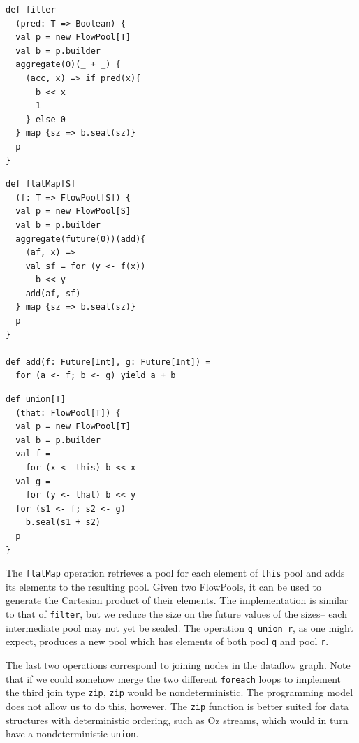 \noindent
\begin{minipage}[t]{5.2 cm}
\begin{verbatim}
def filter
  (pred: T => Boolean) {
  val p = new FlowPool[T]
  val b = p.builder
  aggregate(0)(_ + _) {
    (acc, x) => if pred(x){
      b << x
      1
    } else 0
  } map {sz => b.seal(sz)}
  p
}
\end{verbatim}
\end{minipage}\begin{minipage}[t]{5.3 cm}
\begin{verbatim}
def flatMap[S]
  (f: T => FlowPool[S]) {
  val p = new FlowPool[S]
  val b = p.builder
  aggregate(future(0))(add){
    (af, x) =>
    val sf = for (y <- f(x))
      b << y
    add(af, sf)
  } map {sz => b.seal(sz)}
  p
}

def add(f: Future[Int], g: Future[Int]) =
  for (a <- f; b <- g) yield a + b
\end{verbatim}
\end{minipage}
\begin{minipage}[t]{4 cm}
\begin{verbatim}
def union[T]
  (that: FlowPool[T]) {
  val p = new FlowPool[T]
  val b = p.builder
  val f =
    for (x <- this) b << x
  val g =
    for (y <- that) b << y
  for (s1 <- f; s2 <- g)
    b.seal(s1 + s2)
  p
}
\end{verbatim}
\end{minipage}

The \verb=flatMap= operation retrieves a pool for each element of
\verb=this= pool and adds its elements to the resulting pool.
Given two FlowPools, it can be used to generate the Cartesian product
of their elements.
The implementation is similar to that of \verb=filter=,
but we reduce the size on the future values of the sizes-- each
intermediate pool may not yet be sealed.
The operation \verb=q union r=, as one might expect, produces a new
pool which has elements of both pool \verb=q= and pool \verb=r=.

The last two operations correspond to joining nodes in the dataflow
graph.
Note that if we could somehow merge the two different \verb=foreach=
loops to implement the third join type \verb=zip=, \verb=zip= would
be nondeterministic.
The programming model does not allow us to do this, however.
The \verb=zip= function is better suited for data structures with deterministic ordering,
such as Oz streams, which would in turn have a nondeterministic \verb=union=.


